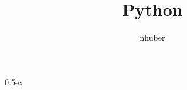 \documentclass[11pt,a4paper]{article}
\begin{document}
\title{Python}
\author{nhuber}
\maketitle

\tableofcontents

\parindent 0pt\parskip 0.5ex



%
%
\end{document}
